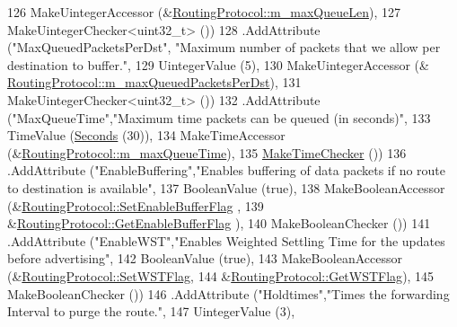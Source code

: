 \begin{DoxyCode}
126                    MakeUintegerAccessor (&\hyperlink{classns3_1_1dsdv_1_1RoutingProtocol_aedf19d36f43f8c0bed80d22b2eec343c}{RoutingProtocol::m\_maxQueueLen}),
127                    MakeUintegerChecker<uint32\_t> ())
128     .AddAttribute (\textcolor{stringliteral}{"MaxQueuedPacketsPerDst"}, \textcolor{stringliteral}{"Maximum number of packets that we allow per destination to
       buffer."},
129                    UintegerValue (5),
130                    MakeUintegerAccessor (&
      \hyperlink{classns3_1_1dsdv_1_1RoutingProtocol_a2bfab14f96b69300b5b86aeaca2b6f64}{RoutingProtocol::m\_maxQueuedPacketsPerDst}),
131                    MakeUintegerChecker<uint32\_t> ())
132     .AddAttribute (\textcolor{stringliteral}{"MaxQueueTime"},\textcolor{stringliteral}{"Maximum time packets can be queued (in seconds)"},
133                    TimeValue (\hyperlink{group__timecivil_ga33c34b816f8ff6628e33d5c8e9713b9e}{Seconds} (30)),
134                    MakeTimeAccessor (&\hyperlink{classns3_1_1dsdv_1_1RoutingProtocol_a99d9a7c27e476c4f0a2c93f889ab8e13}{RoutingProtocol::m\_maxQueueTime}),
135                    \hyperlink{group__time_ga7032965bd4afa578691d88c09e4481c1}{MakeTimeChecker} ())
136     .AddAttribute (\textcolor{stringliteral}{"EnableBuffering"},\textcolor{stringliteral}{"Enables buffering of data packets if no route to destination is
       available"},
137                    BooleanValue (\textcolor{keyword}{true}),
138                    MakeBooleanAccessor (&\hyperlink{classns3_1_1dsdv_1_1RoutingProtocol_a4a3de094f750c655b3119a0111184b67}{RoutingProtocol::SetEnableBufferFlag}
      ,
139                                         &\hyperlink{classns3_1_1dsdv_1_1RoutingProtocol_ac3de22557834f8656657afe95f2f523f}{RoutingProtocol::GetEnableBufferFlag}
      ),
140                    MakeBooleanChecker ())
141     .AddAttribute (\textcolor{stringliteral}{"EnableWST"},\textcolor{stringliteral}{"Enables Weighted Settling Time for the updates before advertising"},
142                    BooleanValue (\textcolor{keyword}{true}),
143                    MakeBooleanAccessor (&\hyperlink{classns3_1_1dsdv_1_1RoutingProtocol_a7dc8bc0bba2c84dc1e50613d2f84f124}{RoutingProtocol::SetWSTFlag},
144                                         &\hyperlink{classns3_1_1dsdv_1_1RoutingProtocol_aa44017be461c04c8abf8ab04d5016d5e}{RoutingProtocol::GetWSTFlag}),
145                    MakeBooleanChecker ())
146     .AddAttribute (\textcolor{stringliteral}{"Holdtimes"},\textcolor{stringliteral}{"Times the forwarding Interval to purge the route."},
147                    UintegerValue (3),

\end{DoxyCode}

